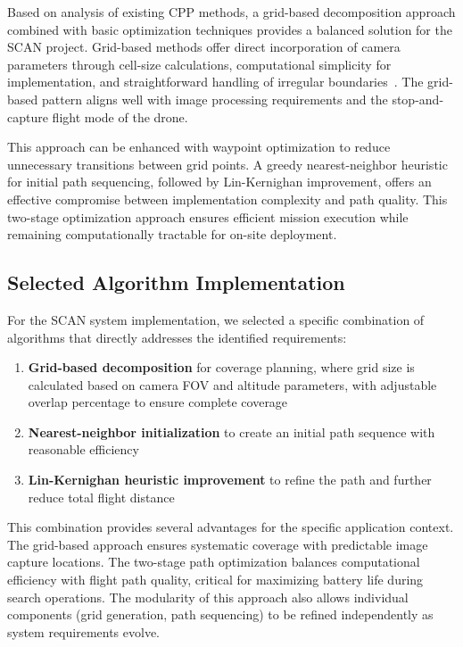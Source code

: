 Based on analysis of existing CPP methods, a grid-based decomposition approach combined with basic optimization techniques provides a balanced solution for the SCAN project. Grid-based methods offer direct incorporation of camera parameters through cell-size calculations, computational simplicity for implementation, and straightforward handling of irregular boundaries~\cite{MathworksUAV}. The grid-based pattern aligns well with image processing requirements and the stop-and-capture flight mode of the drone.

This approach can be enhanced with waypoint optimization to reduce unnecessary transitions between grid points. A greedy nearest-neighbor heuristic for initial path sequencing, followed by Lin-Kernighan improvement, offers an effective compromise between implementation complexity and path quality. This two-stage optimization approach ensures efficient mission execution while remaining computationally tractable for on-site deployment.

\subsection{Selected Algorithm Implementation}

For the SCAN system implementation, we selected a specific combination of algorithms that directly addresses the identified requirements:

\begin{enumerate}
    \item \textbf{Grid-based decomposition} for coverage planning, where grid size is calculated based on camera FOV and altitude parameters, with adjustable overlap percentage to ensure complete coverage
    \item \textbf{Nearest-neighbor initialization} to create an initial path sequence with reasonable efficiency
    \item \textbf{Lin-Kernighan heuristic improvement} to refine the path and further reduce total flight distance
\end{enumerate}

This combination provides several advantages for the specific application context. The grid-based approach ensures systematic coverage with predictable image capture locations. The two-stage path optimization balances computational efficiency with flight path quality, critical for maximizing battery life during search operations. The modularity of this approach also allows individual components (grid generation, path sequencing) to be refined independently as system requirements evolve.

